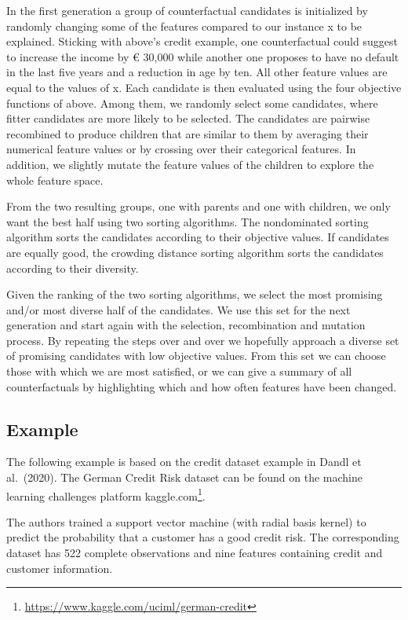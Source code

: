 \documentclass[
  10pt,
]{scrbook}
\renewcommand{\href}[2]{#2\footnote{\url{#1}}}
\begin{document}
In the first generation a group of counterfactual candidates is initialized by randomly changing some of the features compared to our instance x to be explained.
Sticking with above's credit example, one counterfactual could suggest to increase the income by € 30,000 while another one proposes to have no default in the last five years and a reduction in age by ten.
All other feature values are equal to the values of x.
Each candidate is then evaluated using the four objective functions of above.
Among them, we randomly select some candidates, where fitter candidates are more likely to be selected.
The candidates are pairwise recombined to produce children that are similar to them by averaging their numerical feature values or by crossing over their categorical features.
In addition, we slightly mutate the feature values of the children to explore the whole feature space.

From the two resulting groups, one with parents and one with children, we only want the best half using two sorting algorithms.
The nondominated sorting algorithm sorts the candidates according to their objective values.
If candidates are equally good, the crowding distance sorting algorithm sorts the candidates according to their diversity.

Given the ranking of the two sorting algorithms, we select the most promising and/or most diverse half of the candidates.
We use this set for the next generation and start again with the selection, recombination and mutation process.
By repeating the steps over and over we hopefully approach a diverse set of promising candidates with low objective values.
From this set we can choose those with which we are most satisfied, or we can give a summary of all counterfactuals by highlighting which and how often features have been changed.

\hypertarget{example-8}{%
\subsection{Example}\label{example-8}}

The following example is based on the credit dataset example in Dandl et al.~(2020).
The German Credit Risk dataset can be found on the machine learning challenges platform \href{https://www.kaggle.com/uciml/german-credit}{kaggle.com}.

The authors trained a support vector machine (with radial basis kernel) to predict the probability that a customer has a good credit risk.
The corresponding dataset has 522 complete observations and nine features containing credit and customer information.
\end{document}
